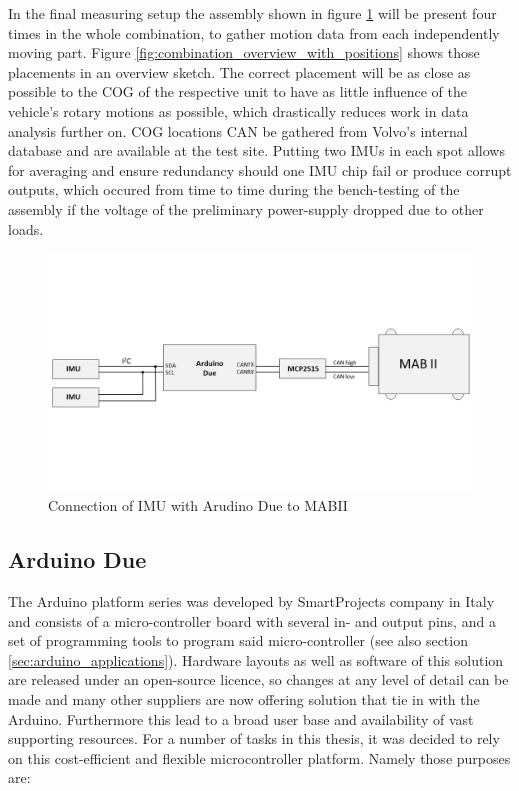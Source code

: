 \documentclass[ExampleMasters.tex]{subfiles}
\begin{document}
In the final measuring setup the assembly shown in figure \ref{fig:IMU_overview} will be present four times in the whole combination, to gather motion data from each independently moving part. Figure \ref{fig:combination_overview_with_positions} shows those placements in an overview sketch. The correct placement will be as close as possible to the \gls{COG} of the respective unit to have as little influence of the vehicle's rotary motions as possible, which drastically reduces work in  data analysis further on. \gls{COG}  locations \gls{CAN} be gathered from Volvo's internal database and are available at the test site. Putting two \gls{IMU}s in each spot allows for averaging and ensure redundancy should one \gls{IMU} chip fail or produce corrupt outputs, which occured from time to time during the bench-testing of the assembly if the voltage of the preliminary power-supply dropped due to other loads.\\

\begin{figure}[!htb]
\centering
\includegraphics[width=1\linewidth]{figures/IMU_overview}
\caption{Connection of \gls{IMU} with Arudino Due to \gls{MABII}}
\label{fig:IMU_overview}
\end{figure}



\subsection{Arduino Due}
\label{sec:arduino}

The Arduino platform series was developed by  SmartProjects company in Italy and consists of a micro-controller board with several in- and output pins, and a set of programming tools to program said micro-controller (see also section \ref{sec:arduino_applications}). Hardware layouts as well as software of this solution are released under an open-source licence, so changes at any level of detail can be made and many other suppliers are now offering solution that tie in with the Arduino. Furthermore this lead to a broad user base and availability of vast supporting resources. For a number of tasks in this thesis, it was decided to rely on this cost-efficient and flexible microcontroller platform. Namely those purposes are:
\end{document}
